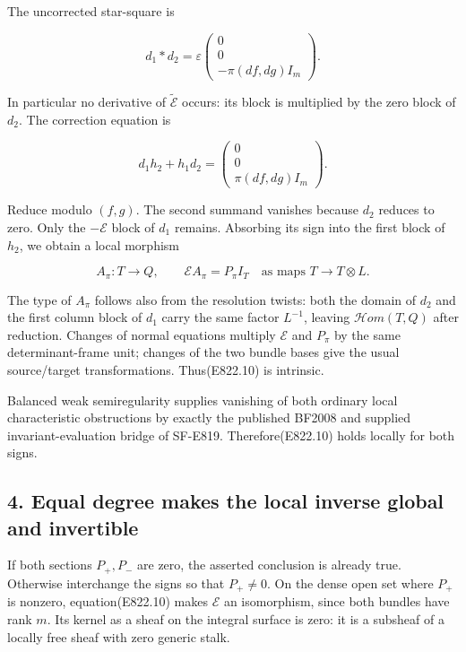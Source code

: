 The uncorrected star-square is

\[
 d_1*d_2
   =\varepsilon\begin{pmatrix}0\\0\\-\pi(df,dg)I_m\end{pmatrix}.
 \tag{E822.8}
\]

In particular no derivative of \(\widetilde{\mathcal E}\) occurs: its
block is multiplied by the zero block of \(d_2\). The correction
equation is

\[
 d_1h_2+h_1d_2
   =\begin{pmatrix}0\\0\\\pi(df,dg)I_m\end{pmatrix}.
 \tag{E822.9}
\]

Reduce modulo \((f,g)\). The second summand vanishes because \(d_2\)
reduces to zero. Only the \(-\mathcal E\) block of \(d_1\) remains.
Absorbing its sign into the first block of \(h_2\), we obtain a local
morphism

\[
 A_\pi:T\longrightarrow Q,
 \qquad
 \mathcal E A_\pi=P_\pi I_T
       \quad\text{as maps }T\to T\otimes L.
 \tag{E822.10}
\]

The type of \(A_\pi\) follows also from the resolution twists: both the
domain of \(d_2\) and the first column block of \(d_1\) carry the same
factor \(L^{-1}\), leaving \(\mathcal H om(T,Q)\) after reduction.
Changes of normal equations multiply \(\mathcal E\) and \(P_\pi\) by the
same determinant-frame unit; changes of the two bundle bases give the
usual source/target transformations. Thus(E822.10) is intrinsic.

Balanced weak semiregularity supplies vanishing of both ordinary local
characteristic obstructions by exactly the published BF2008 and supplied
invariant-evaluation bridge of SF-E819. Therefore(E822.10) holds locally
for both signs.

\subsection{4. Equal degree makes the local inverse global and
invertible}\label{SF-E822-equal-degree-makes-the-local-inverse-global-and-invertible}

If both sections \(P_+,P_-\) are zero, the asserted conclusion is
already true. Otherwise interchange the signs so that \(P_+\ne0\). On
the dense open set where \(P_+\) is nonzero, equation(E822.10) makes
\(\mathcal E\) an isomorphism, since both bundles have rank \(m\). Its
kernel as a sheaf on the integral surface is zero: it is a subsheaf of a
locally free sheaf with zero generic stalk.

